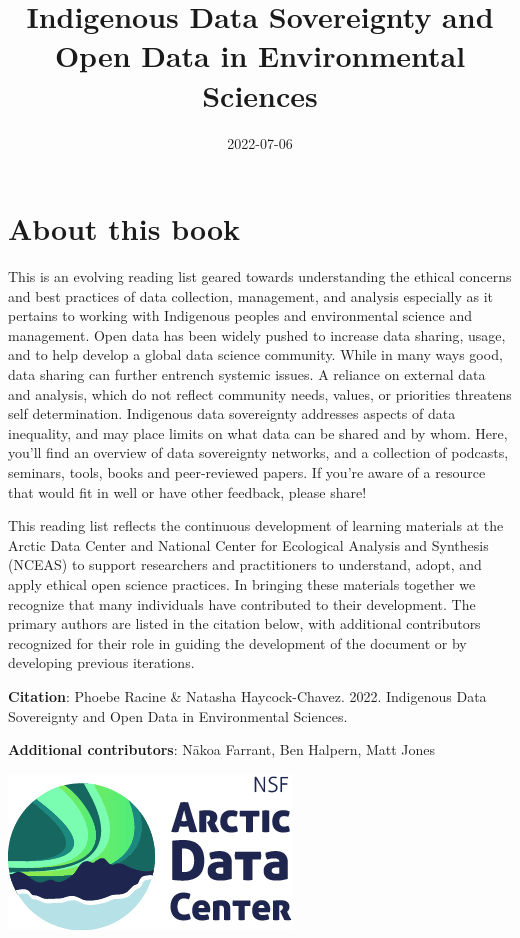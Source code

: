 \documentclass[
]{book}
\title{Indigenous Data Sovereignty and Open Data in Environmental Sciences}
\author{}
\date{\vspace{-2.5em}2022-07-06}
\begin{document}
\maketitle

{
\setcounter{tocdepth}{1}
\tableofcontents
}
\hypertarget{about-this-book}{%
\chapter*{About this book}\label{about-this-book}}

This is an evolving reading list geared towards understanding the ethical concerns and best practices of data collection, management, and analysis especially as it pertains to working with Indigenous peoples and environmental science and management. Open data has been widely pushed to increase data sharing, usage, and to help develop a global data science community. While in many ways good, data sharing can further entrench systemic issues. A reliance on external data and analysis, which do not reflect community needs, values, or priorities threatens self determination. Indigenous data sovereignty addresses aspects of data inequality, and may place limits on what data can be shared and by whom. Here, you'll find an overview of data sovereignty networks, and a collection of podcasts, seminars, tools, books and peer-reviewed papers. If you're aware of a resource that would fit in well or have other feedback, please share!

This reading list reflects the continuous development of learning materials at the Arctic Data Center and National Center for Ecological Analysis and Synthesis (NCEAS) to support researchers and practitioners to understand, adopt, and apply ethical open science practices. In bringing these materials together we recognize that many individuals have contributed to their development. The primary authors are listed in the citation below, with additional contributors recognized for their role in guiding the development of the document or by developing previous iterations.

\textbf{Citation}: Phoebe Racine \& Natasha Haycock-Chavez. 2022. Indigenous Data Sovereignty and Open Data in Environmental Sciences.

\textbf{Additional contributors}: Nākoa Farrant, Ben Halpern, Matt Jones

\includegraphics[width=0.49\linewidth]{images/adc_logo}
\end{document}
